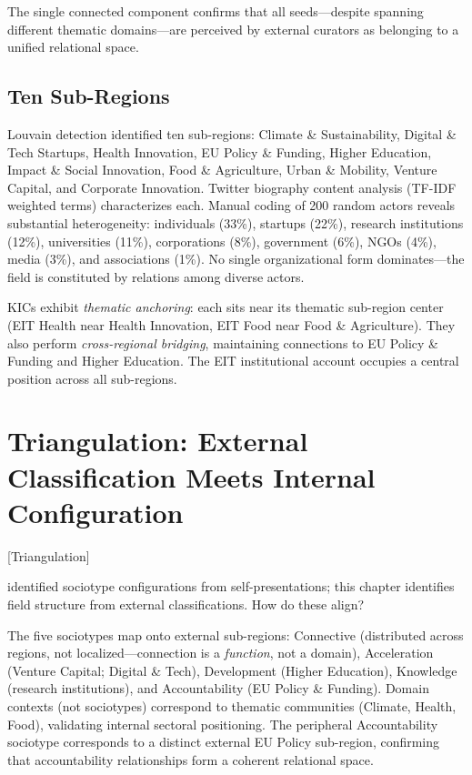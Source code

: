 \documentclass[../main.tex]{subfiles}
\begin{document}
The single connected component confirms that all seeds---despite spanning different thematic domains---are perceived by external curators as belonging to a unified relational space.


\subsection{Ten Sub-Regions}

Louvain detection identified ten sub-regions: Climate \& Sustainability, Digital \& Tech Startups, Health Innovation, EU Policy \& Funding, Higher Education, Impact \& Social Innovation, Food \& Agriculture, Urban \& Mobility, Venture Capital, and Corporate Innovation. Twitter biography content analysis (TF-IDF weighted terms) characterizes each. Manual coding of 200 random actors reveals substantial heterogeneity: individuals (33\%), startups (22\%), research institutions (12\%), universities (11\%), corporations (8\%), government (6\%), NGOs (4\%), media (3\%), and associations (1\%). No single organizational form dominates---the field is constituted by relations among diverse actors.

KICs exhibit \textit{thematic anchoring}: each sits near its thematic sub-region center (EIT Health near Health Innovation, EIT Food near Food \& Agriculture). They also perform \textit{cross-regional bridging}, maintaining connections to EU Policy \& Funding and Higher Education. The EIT institutional account occupies a central position across all sub-regions.


\section{Triangulation: External Classification Meets Internal Configuration}[Triangulation]

 identified sociotype configurations from self-presentations; this chapter identifies field structure from external classifications. How do these align?

The five sociotypes map onto external sub-regions: Connective (distributed across regions, not localized---connection is a \textit{function}, not a domain), Acceleration (Venture Capital; Digital \& Tech), Development (Higher Education), Knowledge (research institutions), and Accountability (EU Policy \& Funding). Domain contexts (not sociotypes) correspond to thematic communities (Climate, Health, Food), validating internal sectoral positioning. The peripheral Accountability sociotype corresponds to a distinct external EU Policy sub-region, confirming that accountability relationships form a coherent relational space.
\end{document}
